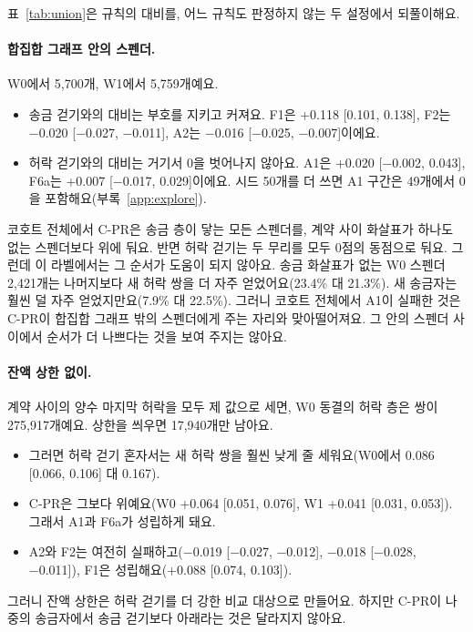 표~\ref{tab:union}은 규칙의 대비를, 어느 규칙도 판정하지 않는 두 설정에서 되풀이해요.

\paragraph{합집합 그래프 안의 스펜더.}
W0에서 5,700개, W1에서 5,759개예요.
\begin{itemize}
\item 송금 걷기와의 대비는 부호를 지키고 커져요. F1은 +0.118 [0.101, 0.138], F2는 −0.020 [−0.027, −0.011], A2는 −0.016 [−0.025, −0.007]이에요.
\item 허락 걷기와의 대비는 거기서 0을 벗어나지 않아요. A1은 +0.020 [−0.002, 0.043], F6a는 +0.007 [−0.017, 0.029]이에요. 시드 50개를 더 쓰면 A1 구간은 49개에서 0을 포함해요(부록~\ref{app:explore}).
\end{itemize}
코호트 전체에서 C-PR은 송금 층이 닿는 모든 스펜더를, 계약 사이 화살표가 하나도 없는 스펜더보다 위에 둬요. 반면 허락 걷기는 두 무리를 모두 0점의 동점으로 둬요. 그런데 이 라벨에서는 그 순서가 도움이 되지 않아요. 송금 화살표가 없는 W0 스펜더 2,421개는 나머지보다 새 허락 쌍을 더 자주 얻었어요(23.4\% 대 21.3\%). 새 송금자는 훨씬 덜 자주 얻었지만요(7.9\% 대 22.5\%). 그러니 코호트 전체에서 A1이 실패한 것은 C-PR이 합집합 그래프 밖의 스펜더에게 주는 자리와 맞아떨어져요. 그 안의 스펜더 사이에서 순서가 더 나쁘다는 것을 보여 주지는 않아요.

\paragraph{잔액 상한 없이.}
계약 사이의 양수 마지막 허락을 모두 제 값으로 세면, W0 동결의 허락 층은 쌍이 275,917개예요. 상한을 씌우면 17,940개만 남아요.
\begin{itemize}
\item 그러면 허락 걷기 혼자서는 새 허락 쌍을 훨씬 낮게 줄 세워요(W0에서 0.086 [0.066, 0.106] 대 0.167).
\item C-PR은 그보다 위예요(W0 +0.064 [0.051, 0.076], W1 +0.041 [0.031, 0.053]). 그래서 A1과 F6a가 성립하게 돼요.
\item A2와 F2는 여전히 실패하고(−0.019 [−0.027, −0.012], −0.018 [−0.028, −0.011]), F1은 성립해요(+0.088 [0.074, 0.103]).
\end{itemize}
그러니 잔액 상한은 허락 걷기를 더 강한 비교 대상으로 만들어요. 하지만 C-PR이 나중의 송금자에서 송금 걷기보다 아래라는 것은 달라지지 않아요.

